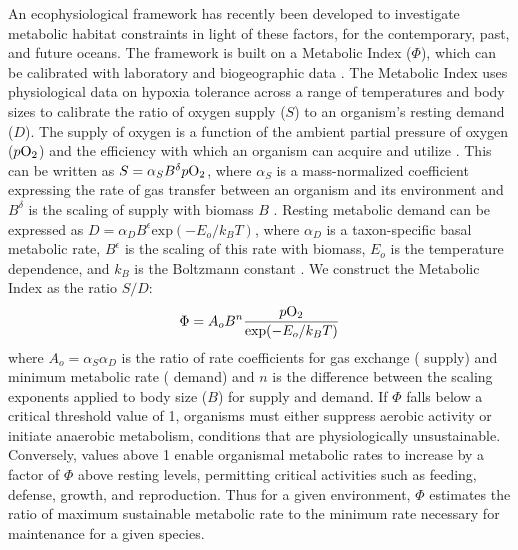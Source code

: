\documentclass[draft,linenumbers]{report_chapter}
\begin{document}
An ecophysiological framework has recently been developed to investigate metabolic habitat constraints in light of these factors, for the contemporary, past, and future oceans.
The framework is built on a Metabolic Index ($\Phi$), which can be calibrated with laboratory and biogeographic data \citep{Deutsch-Ferrel-etal-2015}.
The Metabolic Index uses physiological data on hypoxia tolerance across a range of temperatures and body sizes to calibrate the ratio of oxygen supply ($S$) to an organism's resting demand ($D$).
The supply of oxygen is a function of the ambient partial pressure of oxygen ($p\ce{O2}$) and the efficiency with which an organism can acquire and utilize .
This can be written as $S = \alpha_S B^{\delta}p\ce{O2}$, where $\alpha_S$ is a mass-normalized coefficient expressing the rate of gas transfer between an organism and its environment and $B^{\delta}$ is the scaling of supply with biomass $B$ \citep{Piiper-Dejours-etal-1971}.
Resting metabolic demand can be expressed as $D = \alpha_D B^{\epsilon}\mathrm{exp}(-E_o/k_B T)$, where $\alpha_D$ is a taxon-specific basal metabolic rate, $B^\epsilon$ is the scaling of this rate with biomass, $E_o$ is the temperature dependence, and $k_B$ is the Boltzmann constant \citep{Gillooly-Brown-etal-2001}.
We construct the Metabolic Index as the ratio $S/D$:
\begin{equation}
\Phi = A_o B^n  \frac{p\ce{O2}}{\mathrm{exp}(-E_o/k_B T)}
\label{eqn:MI}
\end{equation}
where $A_o=\alpha_S\alpha_D$ is the ratio of rate coefficients for gas exchange ( supply) and minimum metabolic rate ( demand) and $n$ is the difference between the scaling exponents applied to body size ($B$) for  supply and demand.
If $\Phi$ falls below a critical threshold value of 1, organisms must either suppress aerobic activity or initiate anaerobic metabolism, conditions that are physiologically unsustainable.
Conversely, values above 1 enable organismal metabolic rates to increase by a factor of $\Phi$ above resting levels, permitting critical activities such as feeding, defense, growth, and reproduction.
Thus for a given environment, $\Phi$ estimates the ratio of maximum sustainable metabolic rate to the minimum rate necessary for maintenance for a given species.
\end{document}
